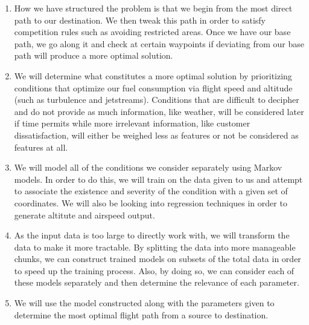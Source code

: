 \documentclass{article}[9pt]
\begin{document}
\begin{enumerate}
    \item How we have structured the problem is that we begin from the most direct path to our destination. We then tweak this path in order to satisfy competition rules such as avoiding restricted areas. Once we have our base path, we go along it and check at certain waypoints if deviating from our base path will produce a more optimal solution. 
    \item We will determine what constitutes a more optimal solution by prioritizing conditions that optimize our fuel consumption via flight speed and altitude (such as turbulence and jetstreams). Conditions that are difficult to decipher and do not provide as much information, like weather, will be considered later if time permits while more irrelevant information, like customer dissatisfaction, will either be weighed less as features or not be considered as features at all.
    \item We will model all of the conditions we consider separately using Markov models. In order to do this, we will train on the data given to us and attempt to associate the existence and severity of the condition with a given set of coordinates. We will also be looking into regression techniques in order to generate altitute and airspeed output.
    \item As the input data is too large to directly work with, we will transform the data to make it more tractable. By splitting the data into more manageable chunks, we can construct trained models on subsets of the total data in order to speed up the training process. Also, by doing so, we can consider each of these models separately and then determine the relevance of each parameter. 
    \item We will use the model constructed along with the parameters given to determine the most optimal flight path from a source to destination.
\end{enumerate}
\end{document}
